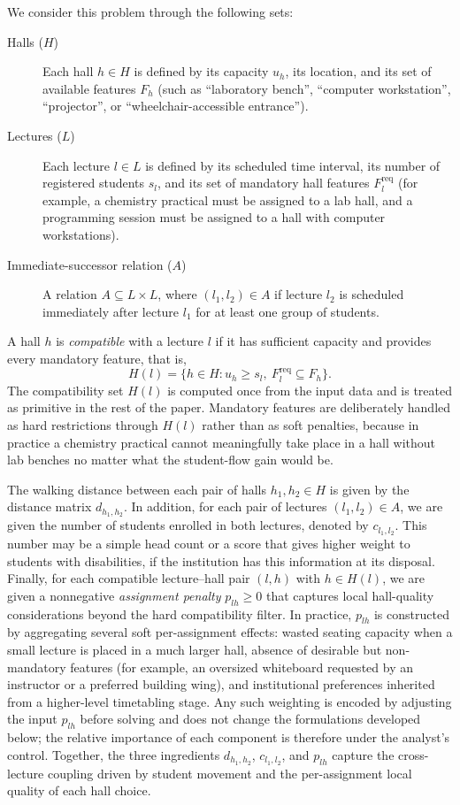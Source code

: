 \documentclass[11pt]{article}
\begin{document}
We consider this problem through the following sets:
\begin{description}
    \item[Halls ($H$)] Each hall $h \in H$ is defined by its capacity $u_h$, its location, and its set of available features $F_h$ (such as ``laboratory bench'', ``computer workstation'', ``projector'', or ``wheelchair-accessible entrance'').
    \item[Lectures ($L$)] Each lecture $l \in L$ is defined by its scheduled time interval, its number of registered students $s_l$, and its set of mandatory hall features $F_l^{\mathrm{req}}$ (for example, a chemistry practical must be assigned to a lab hall, and a programming session must be assigned to a hall with computer workstations).
    \item[Immediate-successor relation ($A$)] A relation $A \subseteq L \times L$, where $(l_1,l_2) \in A$ if lecture $l_2$ is scheduled immediately after lecture $l_1$ for at least one group of students.
    \end{description}

A hall $h$ is \emph{compatible} with a lecture $l$ if it has sufficient capacity and provides every mandatory feature, that is,
\[
H(l) = \{h \in H : u_h \ge s_l,\ F_l^{\mathrm{req}} \subseteq F_h\}.
\]
The compatibility set $H(l)$ is computed once from the input data and is treated as primitive in the rest of the paper. Mandatory features are deliberately handled as hard restrictions through $H(l)$ rather than as soft penalties, because in practice a chemistry practical cannot meaningfully take place in a hall without lab benches no matter what the student-flow gain would be.

The walking distance between each pair of halls $h_1, h_2 \in H$ is given by the distance matrix $d_{h_1,h_2}$. In addition, for each pair of lectures $(l_1,l_2) \in A$, we are given the number of students enrolled in both lectures, denoted by $c_{l_1,l_2}$. This number may be a simple head count or a score that gives higher weight to students with disabilities, if the institution has this information at its disposal. Finally, for each compatible lecture--hall pair $(l,h)$ with $h \in H(l)$, we are given a nonnegative \emph{assignment penalty} $p_{lh} \ge 0$ that captures local hall-quality considerations beyond the hard compatibility filter. In practice, $p_{lh}$ is constructed by aggregating several soft per-assignment effects: wasted seating capacity when a small lecture is placed in a much larger hall, absence of desirable but non-mandatory features (for example, an oversized whiteboard requested by an instructor or a preferred building wing), and institutional preferences inherited from a higher-level timetabling stage. Any such weighting is encoded by adjusting the input $p_{lh}$ before solving and does not change the formulations developed below; the relative importance of each component is therefore under the analyst's control. Together, the three ingredients $d_{h_1,h_2}$, $c_{l_1,l_2}$, and $p_{lh}$ capture the cross-lecture coupling driven by student movement and the per-assignment local quality of each hall choice.
\end{document}
